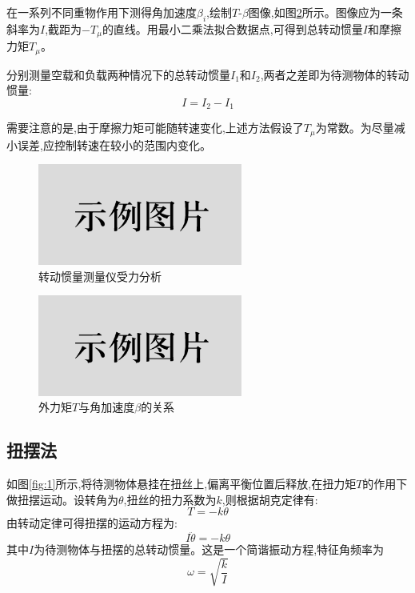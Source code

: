 \documentclass[UTF8]{ctexart}
\begin{document}
    在一系列不同重物作用下测得角加速度$\beta_i$,绘制$T$-$\beta$图像,如图\ref{fig:3}所示。图像应为一条斜率为$I$,截距为$-T_\mu$的直线。用最小二乘法拟合数据点,可得到总转动惯量$I$和摩擦力矩$T_\mu$。
    
    分别测量空载和负载两种情况下的总转动惯量$I_1$和$I_2$,两者之差即为待测物体的转动惯量:
    \begin{equation}
    I=I_2-I_1 \label{eq:7}  
    \end{equation}
    
    需要注意的是,由于摩擦力矩可能随转速变化,上述方法假设了$T_\mu$为常数。为尽量减小误差,应控制转速在较小的范围内变化。
    
    \begin{figure}[htbp]
    \centering
    \includegraphics[width=0.6\textwidth]{rotating_platform.png}
    \caption{转动惯量测量仪受力分析} \label{fig:2}
    \end{figure}
    
    \begin{figure}[htbp]
    \centering
    \includegraphics[width=0.6\textwidth]{T-beta.png}  
    \caption{外力矩$T$与角加速度$\beta$的关系} \label{fig:3}
    \end{figure}
    
    \subsection{扭摆法}
    
    如图\ref{fig:1}所示,将待测物体悬挂在扭丝上,偏离平衡位置后释放,在扭力矩$T$的作用下做扭摆运动。设转角为$\theta$,扭丝的扭力系数为$k$,则根据胡克定律有:
    \begin{equation}
    T=-k\theta \label{eq:8}
    \end{equation}
    由转动定律可得扭摆的运动方程为:
    \begin{equation}
    I\ddot{\theta}=-k\theta \label{eq:9}
    \end{equation}
    其中$I$为待测物体与扭摆的总转动惯量。这是一个简谐振动方程,特征角频率为
    \begin{equation}
    \omega=\sqrt{\frac{k}{I}} \label{eq:10}  
    \end{equation}
    
\end{document}
